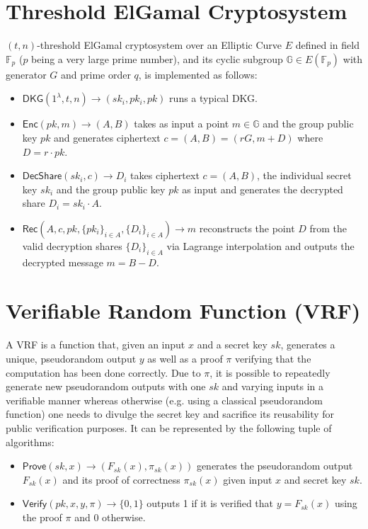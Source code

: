 \documentclass[letterpaper,twocolumn,10pt]{article}
\theoremstyle{definition}
\theoremstyle{remark}
\begin{document}
\section{Threshold ElGamal Cryptosystem}
\label{appendix:thrElGamal}
$(t, n)$-threshold ElGamal cryptosystem \cite{desmedt1990Threshold, fouque2001threshold, cherniaeva2019homomorphic} over an Elliptic Curve $E$ defined in field $\mathbb{F}_p$ ($p$ being a very large prime number), and its cyclic subgroup $\mathbb{G} \in E(\mathbb{F}_p)$ with generator $G$ and prime order $q$, is implemented as follows:
\begin{itemize}
    \item $\mathsf{DKG}(1^\lambda, t, n) \rightarrow (sk_i, pk_i, pk)$ runs a typical DKG.
     \item $\mathsf{Enc}(pk, m) \rightarrow (A, B)$ takes as input a point $m \in \mathbb{G}$ and the group public key $pk$ and generates ciphertext $c = (A, B) = (rG, m+D) $ where $D = r \cdot pk$.
     \item $\mathsf{DecShare}(sk_i, c) \rightarrow D_i$ takes ciphertext $c = (A, B)$, the individual secret key $sk_i$ and the group public key $pk$ as input and generates the decrypted share $D_i = sk_i \cdot A$.
     \item $\mathsf{Rec}(A, c, pk, \{pk_i\}_{i \in A}, \{D_i\}_{i \in A}) \rightarrow m$ reconstructs the point $D$ from the valid decryption shares $\{D_i\}_{i \in A}$ via Lagrange interpolation and outputs the decrypted message $m = B - D$.
\end{itemize}

\iffalse
\section{Verifiable Random Function (VRF)}
\label{appendix:vrf}
A VRF \cite{micali1999verifiable,dodis2005verifiable} is a function that, given an input $x$ and a secret key $sk$, generates a unique, pseudorandom output $y$ as well as a proof $\pi$ verifying that the computation has been done correctly. Due to $\pi$, it is possible to repeatedly generate new pseudorandom outputs with one $sk$ and varying inputs in a verifiable manner whereas otherwise (e.g. using a classical pseudorandom function) one needs to divulge the secret key and sacrifice its reusability for public verification purposes. It can be represented by the following tuple of algorithms:
\begin{itemize}
\item $\mathsf{Prove}(sk, x) \rightarrow (F_{sk}(x), \pi_{sk}(x))$ generates the pseudorandom output $F_{sk}(x)$ and its proof of correctness $\pi_{sk}(x)$ given input $x$ and secret key $sk$.
\item $\mathsf{Verify}(pk, x, y, \pi) \rightarrow \{0, 1\}$ outputs 1 if it is verified that $y = F_{sk}(x)$ using the proof $\pi$ and 0 otherwise.
\end{itemize}
\end{document}
